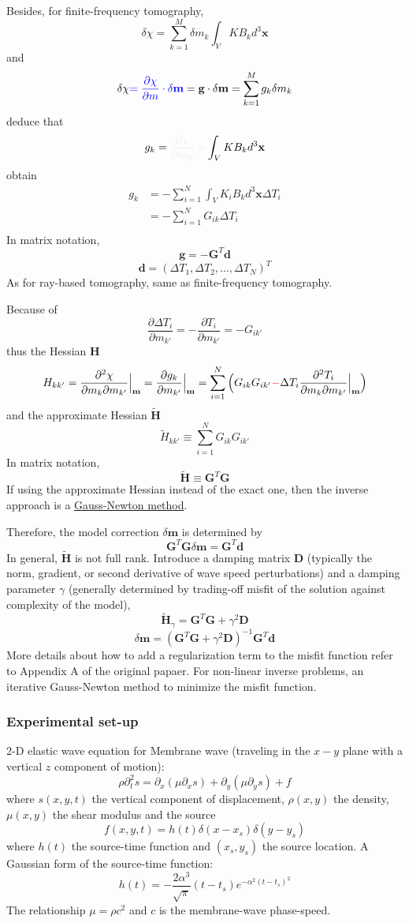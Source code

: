 \documentclass{article}
\newcommand{\mbf}[1]{\mathbf{#1}}
\newcommand{\myem}[1]{{\color{red}\uline{#1}}}
\newcommand{\myno}[1]{{\color{blue}#1}}
\newcommand{\mynno}[1]{{\color{red}#1}}
\newcommand{\myde}[1]{{\color{white!45!lightgray!55}#1}}
\begin{document}
Besides, for finite-frequency tomography,
\[ \delta\chi=\sum_{k=1}^M\delta m_k\int_VKB_kd^3\mbf x \]
and
\[ \delta\chi\myno{=\frac{\partial\chi}{\partial m}\cdot\delta\mbf m}=\mbf g\cdot\delta\mbf m=\sum_{k=1}^Mg_k\delta m_k \]
deduce that
\[ g_k=\myde{\frac{\partial\chi}{\partial m_k}=}\int_VKB_kd^3\mbf x \]
obtain
\begin{align*}
  g_k & =-\sum_{i=1}^N\int_VK_iB_kd^3\mbf x\Delta T_i \\
  & =-\sum_{i=1}^NG_{ik}\Delta T_i \\
\end{align*}
In matrix notation,
\[ \mbf g=-\mbf G^T\mbf d \]
\[ \mbf d=(\Delta T_1,\Delta T_2,\ldots,\Delta T_N)^T \]
As for ray-based tomography, same as finite-frequency tomography.\par
\myno{Because of
\[ \frac{\partial\Delta T_i}{\partial m_{k'}}=-\frac{\partial T_i}{\partial m_{k'}}=-G_{ik'} \]}
thus the Hessian $\mbf H$
\[ H_{kk'}=\frac{\partial^2\chi}{\partial m_k\partial m_{k'}}\Big|_{\mbf m}=\frac{\partial g_k}{\partial m_{k'}}\Big|_{\mbf m}=\sum_{i=1}^N\Big(G_{ik}G_{ik'}\mynno{-}\Delta T_i\frac{\partial^2T_i}{\partial m_k\partial m_{k'}}\Big|_{\mbf m}\Big) \]
and the approximate Hessian $\tilde{\mbf H}$
\[ \tilde H_{kk'}\equiv\sum_{i=1}^NG_{ik}G_{ik'} \]
In matrix notation,
\[ \tilde{\mbf H}\equiv\mbf G^T\mbf G \]
If using the approximate Hessian instead of the exact one, then the inverse approach is a \myem{Gauss-Newton method}.\par
Therefore, the model correction $\delta\mbf m$ is determined by
\[ \mbf G^T\mbf G\delta\mbf m=\mbf G^T\mbf d \]
In general, $\tilde{\mbf H}$ is not full rank. Introduce a damping matrix $\mbf D$ (typically the norm, gradient, or second derivative of wave speed perturbations) and a damping parameter $\gamma$ (generally determined by trading-off misfit of the solution against complexity of the model),
\[ \tilde{\mbf H}_\gamma=\mbf G^T\mbf G+\gamma^2\mbf D \]
\[ \delta\mbf m=(\mbf G^T\mbf G+\gamma^2\mbf D)^{-1}\mbf G^T\mbf d \]
More details about how to add a regularization term to the misfit function refer to Appendix A of the original papaer. For non-linear inverse problems, an iterative Gauss-Newton method to minimize the misfit function.\par
\subsubsection{Experimental set-up}
2-D elastic wave equation for Membrane wave (traveling in the $x-y$ plane with a vertical $z$ component of motion):
\[ \rho\partial^2_ts=\partial_x(\mu\partial_xs)+\partial_y(\mu\partial_ys)+f \]
where $s(x,y,t)$ the vertical component of displacement, $\rho(x,y)$ the density, $\mu(x,y)$ the shear modulus and the source
\[ f(x,y,t)=h(t)\delta(x-x_s)\delta(y-y_s) \]
where $h(t)$ the source-time function and $(x_s,y_s)$ the source location. A Gaussian form of the source-time function:
\[ h(t)=-\frac{2\alpha^3}{\sqrt\pi}(t-t_s)e^{-\alpha^2(t-t_s)^2} \]
The relationship $\mu=\rho c^2$ and $c$ is the membrane-wave phase-speed.\par
\end{document}
